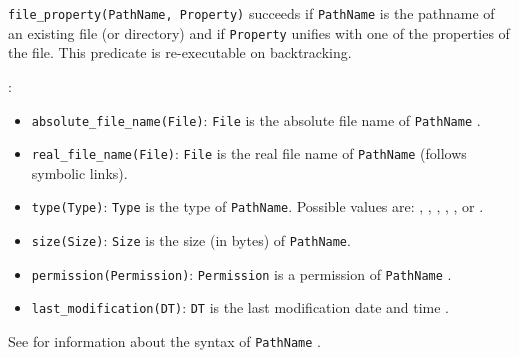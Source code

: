 \Description

\texttt{file\_property(PathName, Property)} succeeds if \texttt{PathName} is
the pathname of an existing file (or directory) and if \texttt{Property}
unifies with one of the properties of the file. This predicate is
re-executable on backtracking.

:

\begin{itemize}

\item {}\texttt{absolute\_file\_name(File)}:
\texttt{File} is the absolute file name of \texttt{PathName}
.

\item {}\texttt{real\_file\_name(File)}: \texttt{File} is
the real file name of \texttt{PathName} (follows symbolic links).

\item {}\texttt{type(Type)}: \texttt{Type} is the type of
  \texttt{PathName}. Possible values are: ,
  , , ,
,  or .

\item {}\texttt{size(Size)}: \texttt{Size} is the size (in bytes) of
\texttt{PathName}.

\item {}\texttt{permission(Permission)}: \texttt{Permission} is a
permission of \texttt{PathName} .

\item {}\texttt{last\_modification(DT)}: \texttt{DT} is
the last modification date and time .

\end{itemize}

See  for information about the syntax of
\texttt{PathName} .

